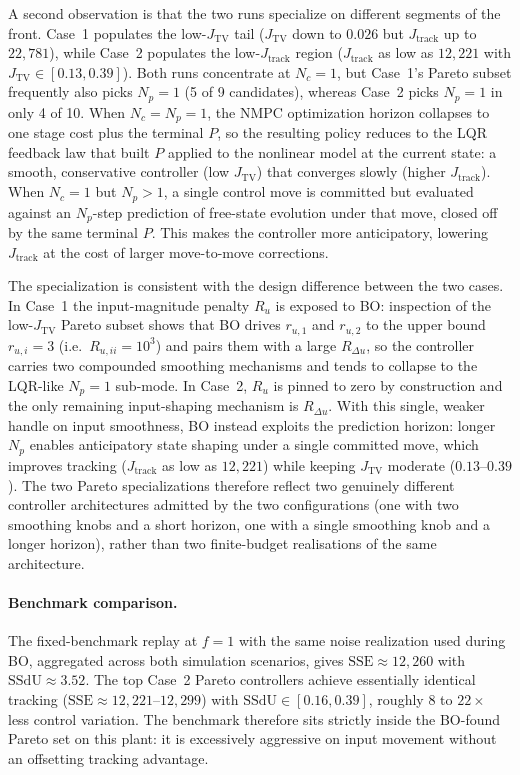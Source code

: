 \documentclass[11pt,a4paper]{article}
\newcommand{\jtrack}{J_{\mathrm{track}}}
\newcommand{\jtv}{J_{\mathrm{TV}}}
\newcommand{\sse}{\mathrm{SSE}}
\newcommand{\ssdu}{\mathrm{SSdU}}
\newcommand{\Nc}{N_c}
\newcommand{\Np}{N_p}
\begin{document}
A second observation is that the two runs specialize on different segments of the front. Case~1 populates the low-$\jtv$ tail ($\jtv$ down to $0.026$ but $\jtrack$ up to $22{,}781$), while Case~2 populates the low-$\jtrack$ region ($\jtrack$ as low as $12{,}221$ with $\jtv \in [0.13, 0.39]$). Both runs concentrate at $\Nc = 1$, but Case~1's Pareto subset frequently also picks $\Np = 1$ (5 of 9 candidates), whereas Case~2 picks $\Np = 1$ in only 4 of 10. When $\Nc = \Np = 1$, the NMPC optimization horizon collapses to one stage cost plus the terminal $P$, so the resulting policy reduces to the LQR feedback law that built $P$ applied to the nonlinear model at the current state: a smooth, conservative controller (low $\jtv$) that converges slowly (higher $\jtrack$). When $\Nc = 1$ but $\Np > 1$, a single control move is committed but evaluated against an $\Np$-step prediction of free-state evolution under that move, closed off by the same terminal $P$. This makes the controller more anticipatory, lowering $\jtrack$ at the cost of larger move-to-move corrections.

The specialization is consistent with the design difference between the two cases. In Case~1 the input-magnitude penalty $R_u$ is exposed to BO: inspection of the low-$\jtv$ Pareto subset shows that BO drives $r_{u,1}$ and $r_{u,2}$ to the upper bound $r_{u,i} = 3$ (i.e.\ $R_{u,ii} = 10^3$) and pairs them with a large $R_{\Delta u}$, so the controller carries two compounded smoothing mechanisms and tends to collapse to the LQR-like $\Np = 1$ sub-mode. In Case~2, $R_u$ is pinned to zero by construction and the only remaining input-shaping mechanism is $R_{\Delta u}$. With this single, weaker handle on input smoothness, BO instead exploits the prediction horizon: longer $\Np$ enables anticipatory state shaping under a single committed move, which improves tracking ($\jtrack$ as low as $12{,}221$) while keeping $\jtv$ moderate ($0.13$--$0.39$). The two Pareto specializations therefore reflect two genuinely different controller architectures admitted by the two configurations (one with two smoothing knobs and a short horizon, one with a single smoothing knob and a longer horizon), rather than two finite-budget realisations of the same architecture.

\paragraph{Benchmark comparison.}
The fixed-benchmark replay at $f = 1$ with the same noise realization used during BO, aggregated across both simulation scenarios, gives $\sse \approx 12{,}260$ with $\ssdu \approx 3.52$. The top Case~2 Pareto controllers achieve essentially identical tracking ($\sse \approx 12{,}221$--$12{,}299$) with $\ssdu \in [0.16, 0.39]$, roughly $8$ to $22\times$ less control variation. The benchmark therefore sits strictly inside the BO-found Pareto set on this plant: it is excessively aggressive on input movement without an offsetting tracking advantage.
\end{document}
